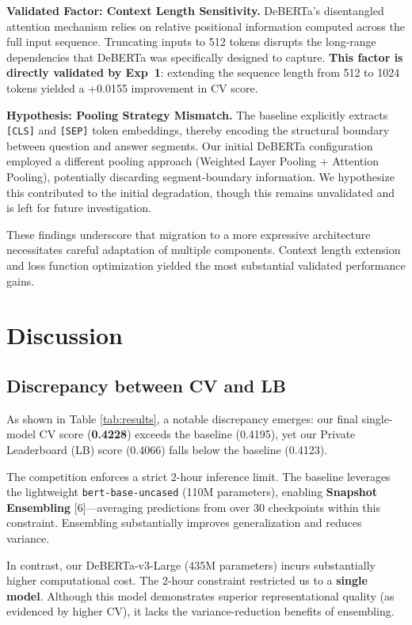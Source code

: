 \documentclass{article}
\begin{document}
\textbf{Validated Factor: Context Length Sensitivity.} DeBERTa's disentangled attention mechanism relies on relative positional information computed across the full input sequence. Truncating inputs to 512 tokens disrupts the long-range dependencies that DeBERTa was specifically designed to capture. \textbf{This factor is directly validated by Exp~1}: extending the sequence length from 512 to 1024 tokens yielded a +0.0155 improvement in CV score.

\textbf{Hypothesis: Pooling Strategy Mismatch.} The baseline explicitly extracts \texttt{[CLS]} and \texttt{[SEP]} token embeddings, thereby encoding the structural boundary between question and answer segments. Our initial DeBERTa configuration employed a different pooling approach (Weighted Layer Pooling + Attention Pooling), potentially discarding segment-boundary information. We hypothesize this contributed to the initial degradation, though this remains unvalidated and is left for future investigation.

These findings underscore that migration to a more expressive architecture necessitates careful adaptation of multiple components. Context length extension and loss function optimization yielded the most substantial validated performance gains.


\section{Discussion}

\subsection{Discrepancy between CV and LB}
As shown in Table \ref{tab:results}, a notable discrepancy emerges: our final single-model CV score (\textbf{0.4228}) exceeds the baseline (0.4195), yet our Private Leaderboard (LB) score (0.4066) falls below the baseline (0.4123).

The competition enforces a strict 2-hour inference limit. The baseline leverages the lightweight \texttt{bert-base-uncased} (110M parameters), enabling \textbf{Snapshot Ensembling} [6]---averaging predictions from over 30 checkpoints within this constraint. Ensembling substantially improves generalization and reduces variance.

In contrast, our DeBERTa-v3-Large (435M parameters) incurs substantially higher computational cost. The 2-hour constraint restricted us to a \textbf{single model}. Although this model demonstrates superior representational quality (as evidenced by higher CV), it lacks the variance-reduction benefits of ensembling.
\end{document}
